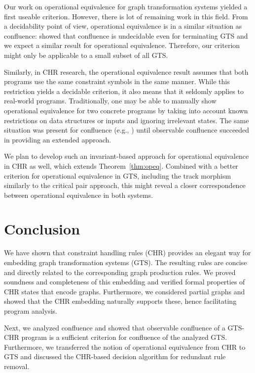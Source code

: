 \documentclass{tlp}
\begin{document}
Our work on operational equivalence for graph transformation systems yielded a
first useable criterion. However, there is lot of remaining work in this field.
From a decidability point of view, operational equivalence is in a similar
situation as confluence: \cite{plump05} showed that confluence is undecidable
even for terminating GTS and we expect a similar result for operational
equivalence. Therefore, our criterion might only be applicable to a small subset
of all GTS.

Similarly, in CHR research, the operational equivalence result assumes that both
programs use the same constraint symbols in the same manner. While this
restriction yields a decidable criterion, it also means that it seldomly applies
to real-world programs. Traditionally, one may be able to manually show
operational equivalence for two concrete programs by taking into account known
restrictions on data structures or inputs and ignoring irrelevant states. The
same situation was present for confluence (e.g., \cite{fruehwirth05}) until
observable confluence \cite{duckstuckeysulzmann07} succeeded in providing an
extended approach.

We plan to develop such an invariant-based approach for operational equivalence
in CHR as well, which extends Theorem~\ref{thm:opeq}. Combined with a better
criterion for operational equivalence in GTS, including the track morphism
similarly to the critical pair approach, this might reveal a closer
correspondence between operational equivalence in both systems.

\section{Conclusion}
\label{sec:conclusion}

We have shown that constraint handling rules (CHR) provides an elegant way for
embedding graph transformation systems (GTS). The resulting rules are concise and
directly related to the corresponding graph production rules. We proved soundness
and completeness of this embedding and verified formal properties of CHR states
that encode graphs. Furthermore, we considered partial graphs and showed that the
CHR embedding naturally supports these, hence facilitating program analysis.

Next, we analyzed confluence and showed that observable confluence of a GTS-CHR
program is a sufficient criterion for confluence of the analyzed GTS.
Furthermore, we transferred the notion of operational equivalence from CHR to GTS
and discussed the CHR-based decision algorithm for redundant rule removal.


\end{document}
